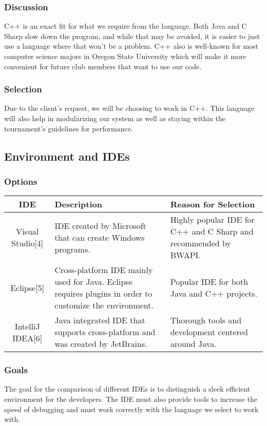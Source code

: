 \documentclass[10pt,letterpaper,onecolumn,draftclsnofoot]{IEEEtran}
\begin{document}
\subsubsection{Discussion}
C++ is an exact fit for what we require from the language. Both Java and C Sharp slow down the program, and while that may be avoided, it is easier to just use a language where that won't be a problem. C++ also is well-known for most computer science majors in Oregon State University which will make it more convenient for future club members that want to use our code.

\subsubsection{Selection}
Due to the client's request, we will be choosing to work in C++. This language will also help in modularizing our system as well as staying within the tournament's guidelines for performance.

\subsection{Environment and IDEs}
\subsubsection{Options}
\begin{center}
\begin{tabular}{ ||C|L|L|| } 
\hline
IDE & Description & Reason for Selection \\
 \hline
 Visual Studio[4] & IDE created by Microsoft that can create Windows programs.  & Highly popular IDE for C++ and C Sharp and recommended by BWAPI. \\ 
 \hline
 Eclipse[5] & Cross-platform IDE mainly used for Java. Eclipse requires plugins in order to customize the environment. & Popular IDE for both Java and C++ projects. \\ 
 \hline
 IntelliJ IDEA[6] & Java integrated IDE that supports cross-platform and was created by JetBrains.
 & Thorough tools and development centered around Java. \\ 
 \hline
\end{tabular}
\end{center}

\subsubsection{Goals}
The goal for the comparison of different IDEs is to distinguish a sleek efficient environment for the developers. The IDE must also provide tools to increase the speed of debugging and must work correctly with the language we select to work with.
\end{document}

